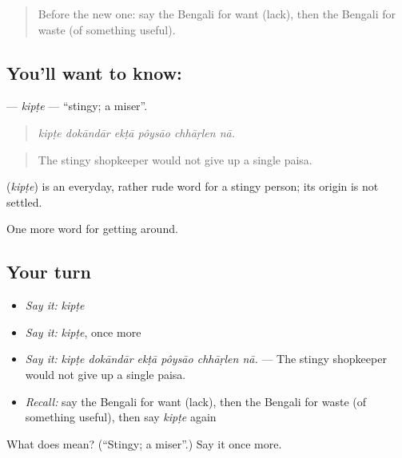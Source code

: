 \begin{quote}
Before the new one: say the Bengali for want (lack), then the Bengali for waste (of something useful).
\end{quote}

\subsection*{You'll want to know: }
\textbf{} — \emph{kipṭe} — \textquotedblleft{}stingy; a miser\textquotedblright{}.

\begin{quote}
     
\end{quote}

\begin{quote}
\emph{kipṭe dokāndār ekṭā pôysāo chhāṛlen nā.}
\end{quote}

\begin{quote}
The stingy shopkeeper would not give up a single paisa.
\end{quote}

\begin{cousinweb}
\textbf{} (\emph{kipṭe}) is an everyday, rather rude word for a stingy person; its origin is not settled.
\end{cousinweb}

\begin{grammarlens}[title={What you've built}]
One more word for getting around.
\end{grammarlens}

\subsection*{Your turn}
\begin{itemize}
\raggedright
  \item \emph{Say it:} \emph{kipṭe}
  \item \emph{Say it:} \emph{kipṭe}, once more
  \item \emph{Say it:} \emph{kipṭe dokāndār ekṭā pôysāo chhāṛlen nā.} — The stingy shopkeeper would not give up a single paisa.
  \item \emph{Recall:} say the Bengali for want (lack), then the Bengali for waste (of something useful), then say \emph{kipṭe} again
\end{itemize}

\begin{tcolorbox}[breakable,colback=teal!4,colframe=teal!35!black,title={Before you move on}]
What does  mean? (\textquotedblleft{}Stingy; a miser\textquotedblright{}.) Say it once more.
\end{tcolorbox}
